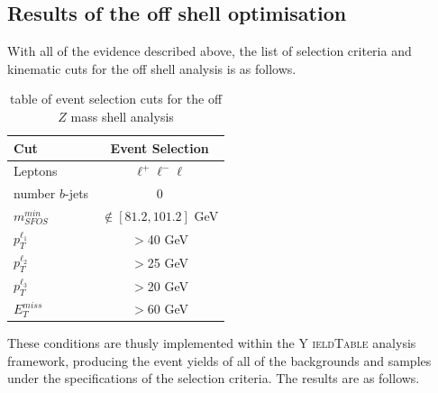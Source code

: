 \subsection{Results of the off shell optimisation}
With all of the evidence described above, the list of selection criteria and kinematic cuts for the off shell analysis is as follows.

\begin{table}[H]
\begin{center}
\begin{tabular}{l | c}
\toprule
Cut & Event Selection \\
\hline
Leptons & $\ell^{+} \ell^{-} \ell$ \\
\hline \hline
number $b$-jets & 0 \\
\hline
$m_{SFOS}^{min}$ & $\notin [81.2, 101.2]$ GeV \\
\hline
$p_{T}^{\ell_{1}}$ & $>$40 GeV \\
\hline
$p_{T}^{\ell_{2}}$ & $>$25 GeV \\
\hline
$p_{T}^{\ell_{3}}$ & $>$20 GeV \\
\hline
$E_{T}^{miss}$ & $>$60 GeV \\
\bottomrule
\end{tabular}
\end{center}
\caption{table of event selection cuts for the off $Z$ mass shell analysis}
\label{tab:offShellConditions}
\end{table}

\noindent These conditions are thusly implemented within the Y {\scshape ieldTable} analysis framework, producing the event yields of all of the backgrounds and samples under the specifications of the selection criteria. 
The results are as follows.

